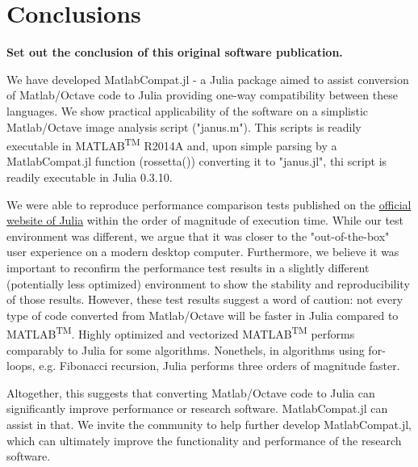 \section{Conclusions}
\label{} 

\textbf{Set out the conclusion of this original software publication.}

We have developed MatlabCompat.jl - a Julia package aimed to assist conversion of Matlab/Octave code to Julia providing one-way compatibility between these languages. We show practical applicability of the software on a simplistic Matlab/Octave image analysis script ("janus.m"). This scripts is readily executable in MATLAB\textsuperscript{TM} R2014A and, upon simple parsing by a MatlabCompat.jl function (rossetta()) converting it to "janus.jl", thi script is readily executable in Julia 0.3.10.

We were able to reproduce performance comparison tests published on the \href{http://julialang.org/benchmarks/}{official website of Julia} within the order of magnitude of execution time. While our test environment was different, we argue that it was closer to the "out-of-the-box" user experience on a modern desktop computer. Furthermore, we believe it was important to reconfirm the performance test results in a slightly different (potentially less optimized) environment to show the stability and reproducibility of those results. However, these test results suggest a word of caution: not every type of code converted from Matlab/Octave will be faster in Julia compared to MATLAB\textsuperscript{TM}. Highly optimized and vectorized MATLAB\textsuperscript{TM} performs comparably to Julia for some algorithms. Nonethels, in algorithms using for-loops, e.g. Fibonacci recursion, Julia performs three orders of magnitude faster.

Altogether, this suggests that converting Matlab/Octave code to Julia can significantly improve performance or research software. MatlabCompat.jl can assist in that. We invite the community to help further develop MatlabCompat.jl, which can ultimately improve the functionality and performance of the research software.
  
  
  
  
